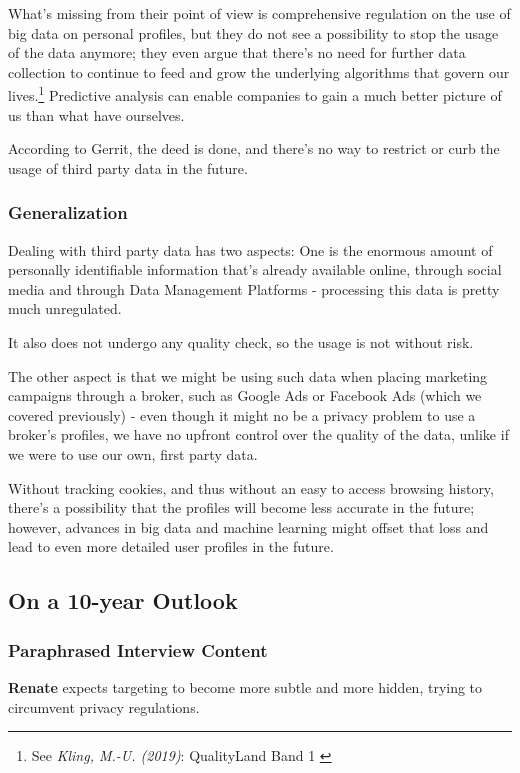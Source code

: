 What's missing from their point of view is comprehensive regulation on the use of big data on personal profiles, but they do not see a possibility to stop the usage of the data anymore; they even argue that there's no need for further data collection to continue to feed and grow the underlying algorithms that govern our lives.\footnote{See \textit{Kling, M.-U. (2019)}: QualityLand Band 1 \cite{qualityLand}} Predictive analysis can enable companies to gain a much better picture of us than what have ourselves.

According to Gerrit, the deed is done, and there's no way to restrict or curb the usage of third party data in the future.

\subsubsection{Generalization}

Dealing with third party data has two aspects: One is the enormous amount of personally identifiable information that's already available online, through social media and through Data Management Platforms - processing this data is pretty much unregulated. 

It also does not undergo any quality check, so the usage is not without risk.

The other aspect is that we might be using such data when placing marketing campaigns through a broker, such as Google Ads or Facebook Ads (which we covered previously) - even though it might no be a privacy problem to use a broker's profiles, we have no upfront control over the quality of the data, unlike if we were to use our own, first party data.

Without tracking cookies, and thus without an easy to access browsing history, there's a possibility that the profiles will become less accurate in the future; however, advances in big data and machine learning might offset that loss and lead to even more detailed user profiles in the future.

\subsection{On a 10-year Outlook}

\subsubsection{Paraphrased Interview Content}

\textbf{Renate} expects targeting to become more subtle and more hidden, trying to circumvent privacy regulations.

